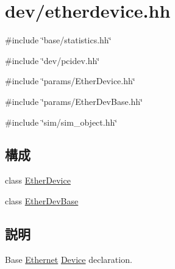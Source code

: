 \hypertarget{etherdevice_8hh}{
\section{dev/etherdevice.hh}
\label{etherdevice_8hh}
}
{\ttfamily \#include \char`\"{}base/statistics.hh\char`\"{}}\par
{\ttfamily \#include \char`\"{}dev/pcidev.hh\char`\"{}}\par
{\ttfamily \#include \char`\"{}params/EtherDevice.hh\char`\"{}}\par
{\ttfamily \#include \char`\"{}params/EtherDevBase.hh\char`\"{}}\par
{\ttfamily \#include \char`\"{}sim/sim\_\-object.hh\char`\"{}}\par
\subsection*{構成}
\begin{DoxyCompactItemize}
\item 
class \hyperlink{classEtherDevice}{EtherDevice}
\item 
class \hyperlink{classEtherDevBase}{EtherDevBase}
\end{DoxyCompactItemize}


\subsection{説明}
Base \hyperlink{namespaceEthernet}{Ethernet} \hyperlink{namespaceDevice}{Device} declaration. 